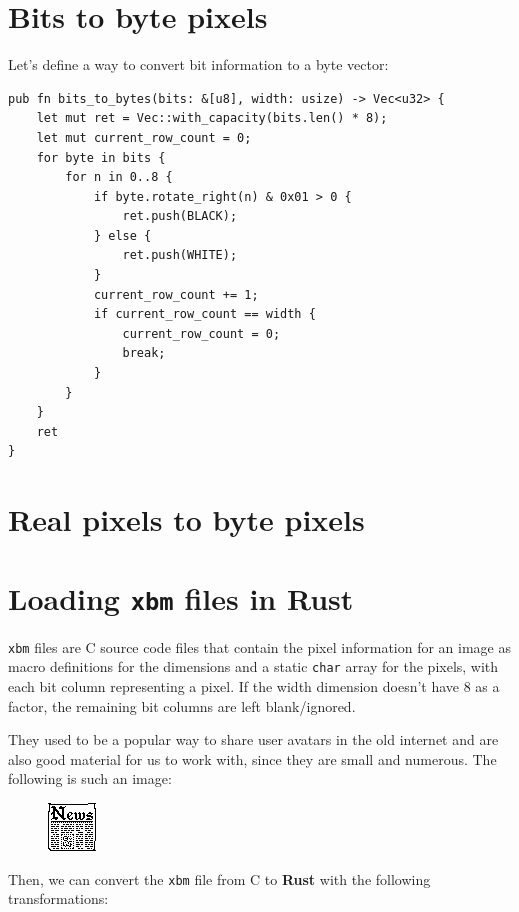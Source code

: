 \documentclass[12pt,a4,oneside,usenames,dvipsnames]{book}
\newcommand\pixel{{\pixelfont{}pixel}}
\newcommand\pixels{{\pixelfont{}pixels}}
\newcommand\Rust{{\fira{}\textbf{Rust}}}
\begin{document}
\chapter{Bits to byte \pixels{}}
Let's define a way to convert bit information to a byte vector:

\begin{verbatim}
pub fn bits_to_bytes(bits: &[u8], width: usize) -> Vec<u32> {
    let mut ret = Vec::with_capacity(bits.len() * 8);
    let mut current_row_count = 0;
    for byte in bits {
        for n in 0..8 {
            if byte.rotate_right(n) & 0x01 > 0 {
                ret.push(BLACK);
            } else {
                ret.push(WHITE);
            }
            current_row_count += 1;
            if current_row_count == width {
                current_row_count = 0;
                break;
            }
        }
    }
    ret
}
\end{verbatim}

\chapter{Real \pixels{} to byte \pixels{}}

\chapter{Loading \texttt{xbm} files in \Rust{}}

\texttt{xbm} files are C source code files that contain the \pixel{} information for an image as macro definitions for the dimensions and a static \texttt{char} array for the \pixels{}, with each bit column representing a pixel. If the width dimension doesn't have 8 as a factor, the remaining bit columns are left blank/ignored.

They used to be a popular way to share user avatars in the old internet and are also good material for us to work with, since they are small and numerous. The following is such an image:

\begin{figure}[H]
\centering
  \includegraphics{figures/news.png}
\end{figure}
Then, we can convert the \texttt{xbm} file from C to \Rust{} with the following transformations:
\end{document}
